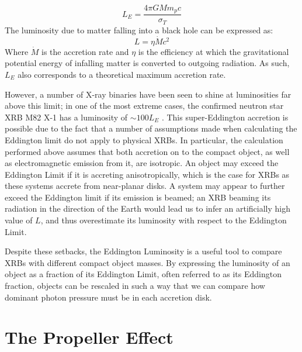 \begin{equation}
L_E=\frac{4\pi GMm_pc}{\sigma_T}
\end{equation}
The luminosity due to matter falling into a black hole can be expressed as:
\begin{equation}
L=\eta\dot{M}c^2
\end{equation}
Where $\dot{M}$ is the accretion rate and $\eta$ is the efficiency at which the gravitational potential energy of infalling matter is converted to outgoing radiation.  As such, $L_E$ also corresponds to a theoretical maximum accretion rate.
\par However, a number of X-ray binaries have been seen to shine at luminosities far above this limit; in one of the most extreme cases, the confirmed neutron star XRB M82 X-1 has a luminosity of $\sim100L_E$ \citep{Bachetti_M82X1}.  This super-Eddington accretion is possible due to the fact that a number of assumptions made when calculating the Eddington limit do not apply to physical XRBs.  In particular, the calculation performed above assumes that both accretion on to the compact object, as well as electromagnetic emission from it, are isotropic.  An object may exceed the Eddington Limit if it is accreting anisotropically, which is the case for XRBs as these systems accrete from near-planar disks.  A system may appear to further exceed the Eddington limit if its emission is beamed; an XRB beaming its radiation in the direction of the Earth would lead us to infer an artificially high value of $L$, and thus overestimate its luminosity with respect to the Eddington Limit.
\par Despite these setbacks, the Eddington Luminosity is a useful tool to compare XRBs with different compact object masses.  By expressing the luminosity of an object as a fraction of its Eddington Limit, often referred to as its Eddington fraction, objects can be rescaled in such a way that we can compare how dominant photon pressure must be in each accretion disk.

\section{The Propeller Effect}

\label{sec:prop}

